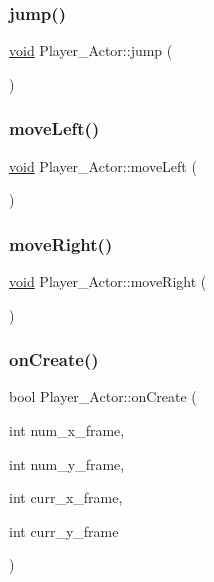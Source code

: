 \subsubsection{\texorpdfstring{jump()}{jump()}}
{\footnotesize\ttfamily \hyperlink{imgui__impl__opengl3__loader_8h_ac668e7cffd9e2e9cfee428b9b2f34fa7}{void} Player\+\_\+\+Actor\+::jump (\begin{DoxyParamCaption}{ }\end{DoxyParamCaption})}

\mbox{\label{classPlayer__Actor_a88fbeecef56bc4fffe695799b3ac2a7f}} 
\subsubsection{\texorpdfstring{move\+Left()}{moveLeft()}}
{\footnotesize\ttfamily \hyperlink{imgui__impl__opengl3__loader_8h_ac668e7cffd9e2e9cfee428b9b2f34fa7}{void} Player\+\_\+\+Actor\+::move\+Left (\begin{DoxyParamCaption}{ }\end{DoxyParamCaption})}

\mbox{\label{classPlayer__Actor_a95230d403ce0b9916033663bfed3c92b}} 
\subsubsection{\texorpdfstring{move\+Right()}{moveRight()}}
{\footnotesize\ttfamily \hyperlink{imgui__impl__opengl3__loader_8h_ac668e7cffd9e2e9cfee428b9b2f34fa7}{void} Player\+\_\+\+Actor\+::move\+Right (\begin{DoxyParamCaption}{ }\end{DoxyParamCaption})}

\mbox{\label{classPlayer__Actor_a4085daf8f3785fbf3934631e66ce7533}} 
\subsubsection{\texorpdfstring{on\+Create()}{onCreate()}}
{\footnotesize\ttfamily bool Player\+\_\+\+Actor\+::on\+Create (\begin{DoxyParamCaption}\item[{int}]{num\+\_\+x\+\_\+frame,  }\item[{int}]{num\+\_\+y\+\_\+frame,  }\item[{int}]{curr\+\_\+x\+\_\+frame,  }\item[{int}]{curr\+\_\+y\+\_\+frame }\end{DoxyParamCaption})}

